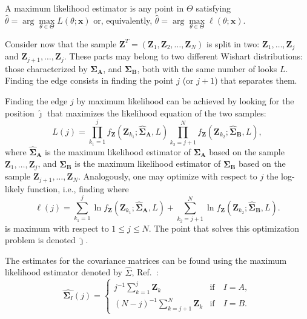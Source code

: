 \documentclass[conference]{IEEEtran}
\begin{document}
A maximum likelihood estimator is any point in $\Theta$ satisfying $\widehat{\theta}= \arg\max\limits_{\theta\in\Theta}L(\theta;\mathbf{x})$ or, equivalently, $\widehat{\theta}= \arg\max\limits_{\theta\in\Theta}\ell(\theta;\mathbf{x})$.

Consider now that the sample $\mathbf{Z}^T=(\mathbf{Z}_1,\mathbf{Z}_2,\dots,\mathbf{Z}_N)$ is split in two: $\mathbf{Z}_1,\dots,\mathbf{Z}_j$ and $\mathbf{Z}_{j+1},\dots,\mathbf{Z}_j$.
These parts may belong to two different Wishart distributions: those characterized by  $\mathbf{\Sigma_A}$, and $\mathbf{\Sigma_B}$, both with the same number of looks $L$.
Finding the edge consists in finding the point $j$ (or $j+1$) that separates them.

Finding the edge $j$ by maximum likelihood can be achieved by looking for the position $\widehat\jmath$  that maximizes the likelihood equation of the two samples:
%
\begin{equation}
	L(j)=\prod_{k_1=1}^{j}f_{\mathbf{Z}}(\mathbf{Z}_{k_1};\mathbf{\widehat\Sigma_{A}},L) \prod_{k_2=j+1}^{N}f_{\mathbf{Z}}(\mathbf{Z}_{k_2};\mathbf{\widehat\Sigma_{B}},L),
	\label{eq_06}
\end{equation}
where $\mathbf{\widehat\Sigma_{A}}$ is the maximum likelihood estimator of $\mathbf{\Sigma_{A}}$ based on the sample $\mathbf{Z}_1,\dots,\mathbf{Z}_{j}$, 
and $\mathbf{\widehat\Sigma_{B}}$ is the maximum likelihood estimator of $\mathbf{\Sigma_{B}}$ based on the sample $\mathbf{Z}_{j+1},\dots,\mathbf{Z}_{N}$.
Analogously, one may optimize with respect to $j$ the log-likely function, i.e., finding where
\begin{equation}
\ell(j) =
	\sum_{k_1=1}^{j}\ln f_{\mathbf{Z}}(\mathbf{Z}_{k_1}; \mathbf{\widehat\Sigma_{A}},L) + \sum_{k_2=j+1}^{N}\ln f_{\mathbf{Z}}(\mathbf{Z}_{k_2};     \mathbf{\widehat\Sigma_{B}},L).
	\label{eq_07}
\end{equation}
is maximum with respect to $1\leq j \leq N$.
The point that solves this optimization problem is denoted $\widehat{\jmath}$.

The estimates for the covariance matrices can be found using the maximum likelihood estimator denoted by $\widehat{\Sigma}$, Ref.~\cite{good}: 
\begin{equation}
\widehat{\mathbf\Sigma_{I}}(j) = \left\{
\begin{array}{lc}
	j^{-1}\sum_{k=1}^{j}\mathbf{Z}_{k}  & \mbox{if}\quad I=A,  \\
        (N-j)^{-1}\sum_{k=j+1}^{N}\mathbf{Z}_{k} & \mbox{if}\quad I=B.
\end{array}
\right.\label{eq_08}
\end{equation}
\end{document}
